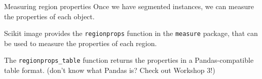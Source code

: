 \documentclass[9pt, aspectratio=169]{beamer}
\begin{document}
\begin{frame}
\begin{columns}
\begin{column}{.3\textwidth}
        \end{column}
    \end{columns}
\end{frame}

\begin{frame}
    {Measuring region properties}
    Once we have segmented instances, we can measure the properties of each object.
    \vspace{2em}

    \pause

    Scikit image provides the \texttt{regionprops} function in the \texttt{measure} package, that can be used to measure the properties of each region.
    \vspace{2em}

    \pause

    The \texttt{regionprops\_table} function returns the properties in a Pandas-compatible table format. (don't know what Pandas is? Check out Workshop 3!)
\end{frame}
\end{document}
